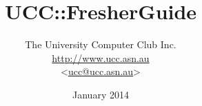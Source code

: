 \begin{titlepage}


\title{UCC::FresherGuide}
\author{The University Computer Club Inc. \\ \url{http://www.ucc.asn.au} \\ <\href{mailto:ucc@ucc.asn.au}{ucc@ucc.asn.au}>}

\date{January 2014}

\maketitle
\centering

\end{titlepage}
